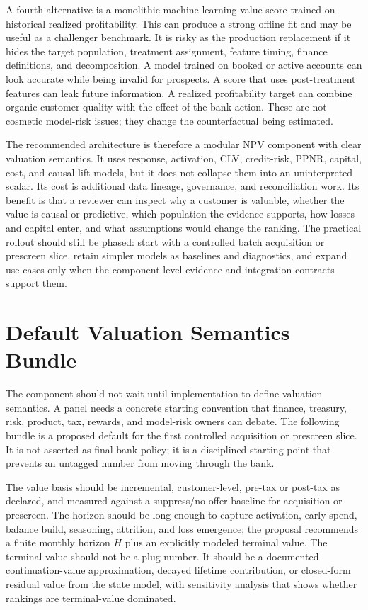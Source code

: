\documentclass[11pt]{article}
\newcommand{\1}{\mathbf{1}}
\begin{document}
A fourth alternative is a monolithic machine-learning value score trained on
historical realized profitability. This can produce a strong offline fit and
may be useful as a challenger benchmark. It is risky as the production
replacement if it hides the target population, treatment assignment, feature
timing, finance definitions, and decomposition. A model trained on booked or
active accounts can look accurate while being invalid for prospects. A score
that uses post-treatment features can leak future information. A realized
profitability target can combine organic customer quality with the effect of
the bank action. These are not cosmetic model-risk issues; they change the
counterfactual being estimated.

The recommended architecture is therefore a modular NPV component with clear
valuation semantics. It uses response, activation, CLV, credit-risk, PPNR,
capital, cost, and causal-lift models, but it does not collapse them into an
uninterpreted scalar. Its cost is additional data lineage, governance, and
reconciliation work. Its benefit is that a reviewer can inspect why a customer
is valuable, whether the value is causal or predictive, which population the
evidence supports, how losses and capital enter, and what assumptions would
change the ranking. The practical rollout should still be phased: start with a
controlled batch acquisition or prescreen slice, retain simpler models as
baselines and diagnostics, and expand use cases only when the component-level
evidence and integration contracts support them.

\section{Default Valuation Semantics Bundle}
\label{sec:valuation-semantics-default}

The component should not wait until implementation to define valuation
semantics. A panel needs a concrete starting convention that finance, treasury,
risk, product, tax, rewards, and model-risk owners can debate. The following
bundle is a proposed default for the first controlled acquisition or prescreen
slice. It is not asserted as final bank policy; it is a disciplined starting
point that prevents an untagged number from moving through the bank.

The value basis should be incremental, customer-level, pre-tax or post-tax as
declared, and measured against a suppress/no-offer baseline for acquisition or
prescreen. The horizon should be long enough to capture activation, early
spend, balance build, seasoning, attrition, and loss emergence; the proposal
recommends a finite monthly horizon $H$ plus an explicitly modeled terminal
value. The terminal value should not be a plug number. It should be a
documented continuation-value approximation, decayed lifetime contribution, or
closed-form residual value from the state model, with sensitivity analysis that
shows whether rankings are terminal-value dominated.
\end{document}
